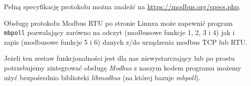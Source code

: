 \noindent
Pełną specyfikację protokołu można znaleźć na \url{https://modbus.org/specs.php}.


Obsługę protokołu Modbus RTU po stronie Linuxa może zapewnić program \Verb$mbpoll$ pozwalający zarówno na odczyt (modbusowe funkcje 1, 2, 3 i 4) jak i zapis (modbusowe funkcje 5 i 6) danych z/do urządzenia modbus TCP lub RTU.

Jeżeli ten zestaw funkcjonalności jest dla nas niewystarczający lub po prostu potrzebujemy zintegrować obsługę \textit{Modbus} z naszym kodem programu możemy użyć bezpośrednio biblioteki \textit{libmodbus} (na której bazuje \textit{mbpoll}).

\ifdefined\useExternalSection
	\let\useExternalSection\undefined
\else
	\let\mysection\undefined
	\let\mysubsection\undefined
\fi
